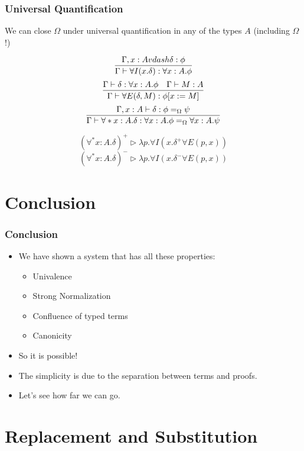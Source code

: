 \begin{frame}
\frametitle{Universal Quantification}

We can close $\Omega$ under universal quantification in any of the types $A$ (including $\Omega$!)

\[ \infer{\Gamma \vdash \forall I (x.\delta) : \forall x : A. \phi}{\Gamma, x : A vdash \delta : \phi} \]
\[ \infer{\Gamma \vdash \forall E(\delta, M) : \phi[x:=M]} {\Gamma \vdash \delta : \forall x :A.\phi \quad \Gamma \vdash M : A} \]
\[ \infer{\Gamma \vdash \forall* x:A.\delta : \forall x:A.\phi =_\Omega \forall x:A.\psi}{\Gamma, x : A \vdash \delta : \phi =_\Omega \psi} \]

\pause

\[ (\forall^* x:A.\delta)^+ \rhd \lambda p. \forall I(x.\delta^+ \forall E(p,x)) \]
\[ (\forall^* x:A.\delta)^- \rhd \lambda p.\forall I(x.\delta^- \forall E(p,x)) \]
\end{frame}

\section{Conclusion}

\begin{frame}
\frametitle{Conclusion}
\begin{itemize}[<+->]
\item
We have shown a system that has all these properties:
\begin{itemize}
\item
Univalence
\item
Strong Normalization
\item
Confluence of typed terms
\item
Canonicity
\end{itemize}
\item
So it is possible!
\item
The simplicity is due to the separation between terms and proofs.
\item
Let's see how far we can go.
\end{itemize}
\end{frame}
\appendix

\section{Replacement and Substitution}
\label{appendix:repsub}















